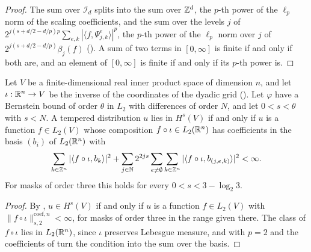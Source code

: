 \begin{proof}
\leanok
{}
The sum over $\mathcal{I}_d$ splits into the sum over $\mathbb{Z}^d$, the $p$-th power of the $\ell_p$
norm of the scaling coefficients, and the sum over the levels $j$ of
$2^{j(s + d/2 - d/p)p} \sum_{e,k} |\langle f, \Psi^e_{j,k} \rangle|^p$, the $p$-th power of the
$\ell_p$ norm over $j$ of $2^{j(s + d/2 - d/p)} \beta_j(f)$ (). A sum of two
terms in $[0, \infty]$ is finite if and only if both are, and an element of $[0, \infty]$ is
finite if and only if its $p$-th power is.
\end{proof}

\begin{corollary}
\label{cor:daub-rd-sobolev-weighted}
\leanok
{}
Let $V$ be a finite-dimensional real inner product space of dimension $n$, and let
$\iota : \mathbb{R}^n \to V$ be the inverse of the coordinates of the dyadic grid
(). Let $\varphi$ have a Bernstein bound of order $\theta$ in $L_2$
with differences of order $N$, and let $0 < s < \theta$ with $s < N$. A tempered distribution
$u$ lies in $H^s(V)$ if and only if $u$ is a function $f \in L_2(V)$ whose composition
$f \circ \iota \in L_2(\mathbb{R}^n)$ has coefficients in the basis $(b_i)$ of $L_2(\mathbb{R}^n)$ with
\[
  \sum_{k \in \mathbb{Z}^n} |\langle f \circ \iota, b_k \rangle|^2
  + \sum_{j \in \mathbb{N}} 2^{2js} \sum_{e \neq \emptyset} \sum_{k \in \mathbb{Z}^n}
    |\langle f \circ \iota, b_{(j,e,k)} \rangle|^2 < \infty .
\]
For masks of order three this holds for every $0 < s < 3 - \log_2 3$.
\end{corollary}

\begin{proof}
\leanok
{}
By , $u \in H^s(V)$ if and only if $u$ is a function $f \in L_2(V)$
with $\|f \circ \iota\|^{\mathrm{coef},n}_{s,2} < \infty$, for masks of order three in the range
given there. The class of $f \circ \iota$ lies in $L_2(\mathbb{R}^n)$, since $\iota$ preserves Lebesgue
measure, and  with $p = 2$ and the coefficients of
 turn the condition into the sum over the basis.
\end{proof}

